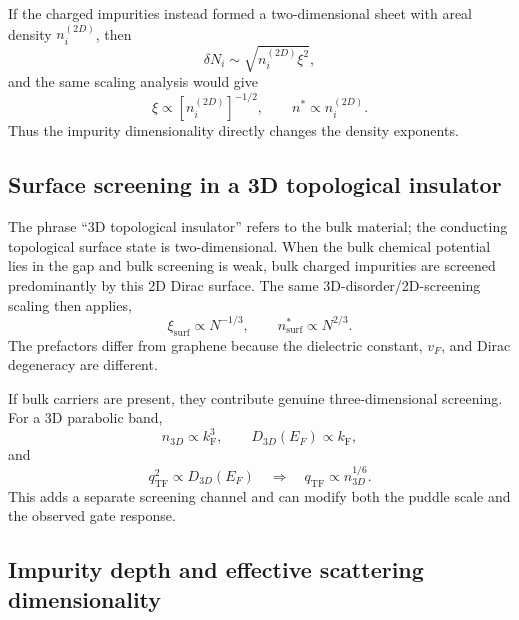 \documentclass[11pt]{article}
\newcommand{\kF}{k_{\mathrm F}}
\newcommand{\qTF}{q_{\mathrm{TF}}}
\begin{document}
If the charged impurities instead formed a two-dimensional sheet with areal density $n_i^{(2D)}$, then
\begin{equation}
    \delta N_i\sim\sqrt{n_i^{(2D)}\xi^2},
\end{equation}
and the same scaling analysis would give
\begin{equation}
    \xi\propto[n_i^{(2D)}]^{-1/2},
    \qquad
    n^*\propto n_i^{(2D)}.
\end{equation}
Thus the impurity dimensionality directly changes the density exponents.

\subsection*{Surface screening in a 3D topological insulator}

The phrase ``3D topological insulator'' refers to the bulk material; the conducting topological surface state is two-dimensional. When the bulk chemical potential lies in the gap and bulk screening is weak, bulk charged impurities are screened predominantly by this 2D Dirac surface. The same 3D-disorder/2D-screening scaling then applies,
\begin{equation}
    \xi_{\mathrm{surf}}\propto N^{-1/3},
    \qquad
    n^*_{\mathrm{surf}}\propto N^{2/3}.
\end{equation}
The prefactors differ from graphene because the dielectric constant, $v_F$, and Dirac degeneracy are different.

If bulk carriers are present, they contribute genuine three-dimensional screening. For a 3D parabolic band,
\begin{equation}
    n_{3D}\propto \kF^3,
    \qquad
    D_{3D}(E_F)\propto\kF,
\end{equation}
and
\begin{equation}
    \qTF^2\propto D_{3D}(E_F)
    \quad\Rightarrow\quad
    \qTF\propto n_{3D}^{1/6}.
\end{equation}
This adds a separate screening channel and can modify both the puddle scale and the observed gate response.

\subsection*{Impurity depth and effective scattering dimensionality}
\end{document}
